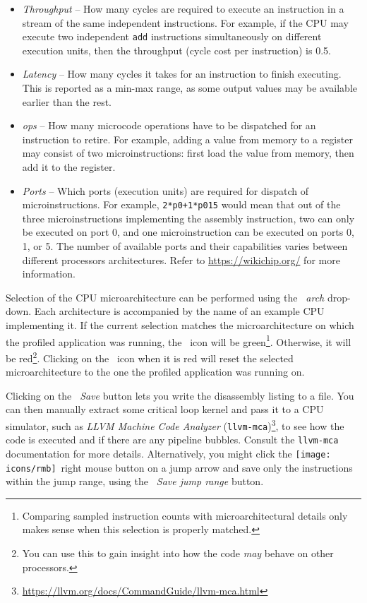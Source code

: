 \documentclass[hidelinks,titlepage,a4paper,twoside]{article}
\newcommand{\RMB}{\texttt{[image: icons/rmb]}}
\begin{document}
\begin{itemize}
\item \emph{Throughput} -- How many cycles are required to execute an instruction in a stream of the same independent instructions. For example, if the CPU may execute two independent \texttt{add} instructions simultaneously on different execution units, then the throughput (cycle cost per instruction) is 0.5.
\item \emph{Latency} -- How many cycles it takes for an instruction to finish executing. This is reported as a min-max range, as some output values may be available earlier than the rest.
\item \emph{\textmu{}ops} -- How many microcode operations have to be dispatched for an instruction to retire. For example, adding a value from memory to a register may consist of two microinstructions: first load the value from memory, then add it to the register.
\item \emph{Ports} -- Which ports (execution units) are required for dispatch of microinstructions. For example, \texttt{2*p0+1*p015} would mean that out of the three microinstructions implementing the assembly instruction, two can only be executed on port 0, and one microinstruction can be executed on ports 0, 1, or 5. The number of available ports and their capabilities varies between different processors architectures. Refer to \url{https://wikichip.org/} for more information.
\end{itemize}

Selection of the CPU microarchitecture can be performed using the \emph{\faMicrochip{}~\textmu{}arch} drop-down. Each architecture is accompanied by the name of an example CPU implementing it. If the current selection matches the microarchitecture on which the profiled application was running, the \faMicrochip{}~icon will be green\footnote{Comparing sampled instruction counts with microarchitectural details only makes sense when this selection is properly matched.}. Otherwise, it will be red\footnote{You can use this to gain insight into how the code \emph{may} behave on other processors.}. Clicking on the \faMicrochip{}~icon when it is red will reset the selected microarchitecture to the one the profiled application was running on.

Clicking on the \emph{\faFileImport{}~Save} button lets you write the disassembly listing to a file. You can then manually extract some critical loop kernel and pass it to a CPU simulator, such as \emph{LLVM Machine Code Analyzer} (\texttt{llvm-mca})\footnote{\url{https://llvm.org/docs/CommandGuide/llvm-mca.html}}, to see how the code is executed and if there are any pipeline bubbles. Consult the \texttt{llvm-mca} documentation for more details. Alternatively, you might click the \RMB{}~right mouse button on a jump arrow and save only the instructions within the jump range, using the \emph{\faFileImport{}~Save jump range} button.
\end{document}
